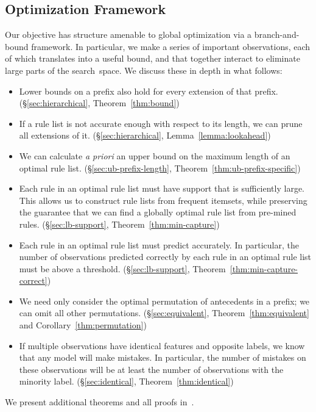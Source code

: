 \documentclass[twoside,11pt]{article}
\begin{document}
\subsection{Optimization Framework}
\label{sec:optimization}

Our objective has structure amenable to global optimization via a branch-and-bound framework.
%
In particular, we make a series of important observations, each of which translates into
a useful bound, and that together interact to eliminate large parts of the search~space.
%
We discuss these in depth in what follows:
%
\begin{itemize}
\item Lower bounds on a prefix also hold for every extension of that prefix.
(\S\ref{sec:hierarchical}, Theorem~\ref{thm:bound})

\item If a rule list is not accurate enough with respect to its length,
we can prune all extensions of it.
(\S\ref{sec:hierarchical}, Lemma~\ref{lemma:lookahead})

\item We can calculate \emph{a priori} an upper bound on the maximum length
of an optimal rule list.
(\S\ref{sec:ub-prefix-length}, Theorem~\ref{thm:ub-prefix-specific})

\item Each rule in an optimal rule list must have support that is sufficiently large.
%
This allows us to construct rule lists from frequent itemsets,
while preserving the guarantee that we can find a globally optimal
rule list from pre-mined rules.
(\S\ref{sec:lb-support}, Theorem~\ref{thm:min-capture})

\item Each rule in an optimal rule list must predict accurately.
%
In particular, the number of observations predicted correctly
by each rule in an optimal rule list must be above a threshold.
(\S\ref{sec:lb-support}, Theorem~\ref{thm:min-capture-correct})

\item We need only consider the optimal permutation of antecedents in a prefix;
we can omit all other permutations.
(\S\ref{sec:equivalent}, Theorem~\ref{thm:equivalent} and Corollary~\ref{thm:permutation})

\item  If multiple observations have identical features and opposite labels,
we know that any model will make mistakes.
%
In particular, the number of mistakes on these observations will be at least
the number of observations with the minority label.
(\S\ref{sec:identical}, Theorem~\ref{thm:identical})
\end{itemize}
\begin{kdd}
We present additional theorems and all proofs in~\citep{AngelinoLaAlSeRu17}.
\end{kdd}
\end{document}
